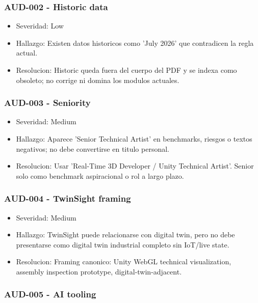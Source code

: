 \subsubsection{AUD-002 - Historic data}


\begin{itemize}
\item Severidad: Low
\item Hallazgo: Existen datos historicos como 'July 2026' que contradicen la regla actual.
\item Resolucion: Historic queda fuera del cuerpo del PDF y se indexa como obsoleto; no corrige ni domina los modulos actuales.
\end{itemize}


\subsubsection{AUD-003 - Seniority}


\begin{itemize}
\item Severidad: Medium
\item Hallazgo: Aparece 'Senior Technical Artist' en benchmarks, riesgos o textos negativos; no debe convertirse en titulo personal.
\item Resolucion: Usar 'Real-Time 3D Developer / Unity Technical Artist'. Senior solo como benchmark aspiracional o rol a largo plazo.
\end{itemize}


\subsubsection{AUD-004 - TwinSight framing}


\begin{itemize}
\item Severidad: Medium
\item Hallazgo: TwinSight puede relacionarse con digital twin, pero no debe presentarse como digital twin industrial completo sin IoT/live state.
\item Resolucion: Framing canonico: Unity WebGL technical visualization, assembly inspection prototype, digital-twin-adjacent.
\end{itemize}


\subsubsection{AUD-005 - AI tooling}


